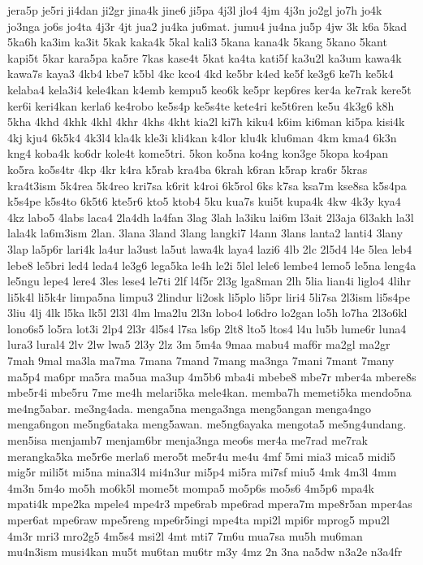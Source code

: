 jera5p
je5ri
ji4dan
ji2gr
jina4k
jine6
ji5pa
4j3l
jlo4
4jm
4j3n
jo2gl
jo7h
jo4k
jo3nga
jo6s
jo4ta
4j3r
4jt
jua2
ju4ka
ju6mat.
jumu4
ju4na
ju5p
4jw
3k
k6a
5kad
5ka6h
ka3im
ka3it
5kak
kaka4k
5kal
kali3
5kana
kana4k
5kang
5kano
5kant
kapi5t
5kar
kara5pa
ka5re
7kas
kase4t
5kat
ka4ta
kati5f
ka3u2l
ka3um
kawa4k
kawa7s
kaya3
4kb4
kbe7
k5bl
4kc
kco4
4kd
ke5br
k4ed
ke5f
ke3g6
ke7h
ke5k4
kelaba4
kela3i4
kele4kan
k4emb
kempu5
keo6k
ke5pr
kep6res
ker4a
ke7rak
kere5t
ker6i
keri4kan
kerla6
ke4robo
ke5s4p
ke5s4te
kete4ri
ke5t6ren
ke5u
4k3g6
k8h
5kha
4khd
4khk
4khl
4khr
4khs
4kht
kia2l
ki7h
kiku4
k6im
ki6man
ki5pa
kisi4k
4kj
kju4
6k5k4
4k3l4
kla4k
kle3i
kli4kan
k4lor
klu4k
klu6man
4km
kma4
6k3n
kng4
koba4k
ko6dr
kole4t
kome5tri.
5kon
ko5na
ko4ng
kon3ge
5kopa
ko4pan
ko5ra
ko5s4tr
4kp
4kr
k4ra
k5rab
kra4ba
6krah
k6ran
k5rap
kra6r
5kras
kra4t3ism
5k4rea
5k4reo
kri7sa
k6rit
k4roi
6k5rol
6ks
k7sa
ksa7m
kse8sa
k5s4pa
k5s4pe
k5s4to
6k5t6
kte5r6
kto5
ktob4
5ku
kua7s
kui5t
kupa4k
4kw
4k3y
kya4
4kz
labo5
4labs
laca4
2la4dh
la4fan
3lag
3lah
la3iku
lai6m
l3ait
2l3aja
6l3akh
la3l
lala4k
la6m3ism
2lan.
3lana
3land
3lang
langki7
l4ann
3lans
lanta2
lanti4
3lany
3lap
la5p6r
lari4k
la4ur
la3ust
la5ut
lawa4k
laya4
lazi6
4lb
2lc
2l5d4
l4e
5lea
leb4
lebe8
le5bri
led4
leda4
le3g6
lega5ka
le4h
le2i
5lel
lele6
lembe4
lemo5
le5na
leng4a
le5ngu
lepe4
lere4
3les
lese4
le7ti
2lf
l4f5r
2l3g
lga8man
2lh
5lia
lian4i
liglo4
4lihr
li5k4l
li5k4r
limpa5na
limpu3
2lindur
li2osk
li5plo
li5pr
liri4
5li7sa
2l3ism
li5s4pe
3liu
4lj
4lk
l5ka
lk5l
2l3l
4lm
lma2lu
2l3n
lobo4
lo6dro
lo2gan
lo5h
lo7ha
2l3o6kl
lono6s5
lo5ra
lot3i
2lp4
2l3r
4l5s4
l7sa
ls6p
2lt8
lto5
ltos4
l4u
lu5b
lume6r
luna4
lura3
lural4
2lv
2lw
lwa5
2l3y
2lz
3m
5m4a
9maa
mabu4
maf6r
ma2gl
ma2gr
7mah
9mal
ma3la
ma7ma
7mana
7mand
7mang
ma3nga
7mani
7mant
7many
ma5p4
ma6pr
ma5ra
ma5ua
ma3up
4m5b6
mba4i
mbebe8
mbe7r
mber4a
mbere8s
mbe5r4i
mbe5ru
7me
me4h
melari5ka
mele4kan.
memba7h
memeti5ka
mendo5na
me4ng5abar.
me3ng4ada.
menga5na
menga3nga
meng5angan
menga4ngo
menga6ngon
me5ng6ataka
meng5awan.
me5ng6ayaka
mengota5
me5ng4undang.
men5isa
menjamb7
menjam6br
menja3nga
meo6s
mer4a
me7rad
me7rak
merangka5ka
me5r6e
merla6
mero5t
me5r4u
me4u
4mf
5mi
mia3
mica5
midi5
mig5r
mili5t
mi5na
mina3l4
mi4n3ur
mi5p4
mi5ra
mi7sf
miu5
4mk
4m3l
4mm
4m3n
5m4o
mo5h
mo6k5l
mome5t
mompa5
mo5p6s
mo5s6
4m5p6
mpa4k
mpati4k
mpe2ka
mpele4
mpe4r3
mpe6rab
mpe6rad
mpera7m
mpe8r5an
mper4as
mper6at
mpe6raw
mpe5reng
mpe6r5ingi
mpe4ta
mpi2l
mpi6r
mprog5
mpu2l
4m3r
mri3
mro2g5
4m5s4
msi2l
4mt
mti7
7m6u
mua7sa
mu5h
mu6man
mu4n3ism
musi4kan
mu5t
mu6tan
mu6tr
m3y
4mz
2n
3na
na5dw
n3a2e
n3a4fr
